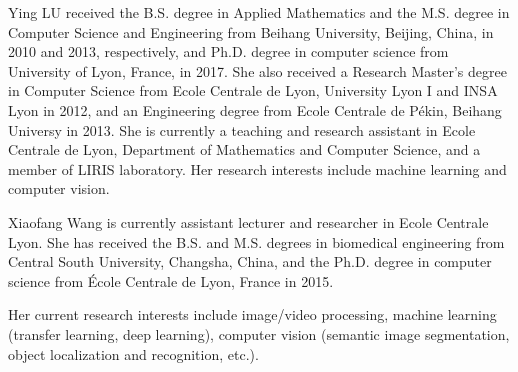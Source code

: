 \documentclass[journal,twocolumn]{IEEEtran}
\begin{document}
\begin{CJK*}{UTF8}{gkai}
\begin{IEEEbiography}   {Ying LU}
received the B.S. degree in Applied Mathematics and the M.S. degree in Computer Science and Engineering from Beihang University, Beijing, China, in 2010 and 2013, respectively, and Ph.D. degree in computer science from University of Lyon, France, in 2017. She also received a Research Master's degree in Computer Science from Ecole Centrale de Lyon, University Lyon I and INSA Lyon in 2012, and an Engineering degree from Ecole Centrale de Pékin, Beihang Universy in 2013. She is currently a teaching and research assistant in Ecole Centrale de Lyon, Department of Mathematics and Computer Science, and a member of LIRIS laboratory. Her research interests include machine learning and computer vision.


\end{IEEEbiography}
	\vspace{-5pt} 
\begin{IEEEbiography}{Xiaofang Wang} is currently assistant lecturer and researcher in Ecole Centrale Lyon. She has received the B.S. and M.S. degrees in biomedical engineering from Central South University, Changsha, China, and the Ph.D. degree in computer science from \'Ecole Centrale de Lyon, France in 2015.

Her current research interests include image/video processing, machine learning (transfer learning, deep learning), computer vision (semantic image segmentation, object localization and recognition, etc.).
\end{IEEEbiography}

\end{CJK*}
\end{document}
